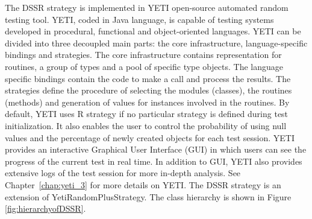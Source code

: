 The DSSR strategy is implemented in YETI open-source automated random testing tool. YETI, coded in Java language, is capable of testing systems developed in procedural, functional and object-oriented languages.
YETI can be divided into three decoupled main parts: the core infrastructure, language-specific bindings and strategies. The core infrastructure contains representation for routines, a group of types and a pool of specific type objects. The language specific bindings contain the code to make a call and process the results. The strategies define the procedure of selecting the modules (classes), the routines (methods) and generation of values for instances involved in the routines. By default, YETI uses R strategy if no particular strategy is defined during test initialization. It also enables the user to control the probability of using null values and the percentage of newly created objects for each test session. YETI provides an interactive Graphical User Interface (GUI) in which users can see the progress of the current test in real time. In addition to GUI, YETI also provides extensive logs of the test session for more in-depth analysis. See Chapter~\ref{chap:yeti_3} for more details on YETI. The DSSR strategy is an extension of YetiRandomPlusStrategy. The class hierarchy is shown in Figure \ref{fig:hierarchyofDSSR}.

